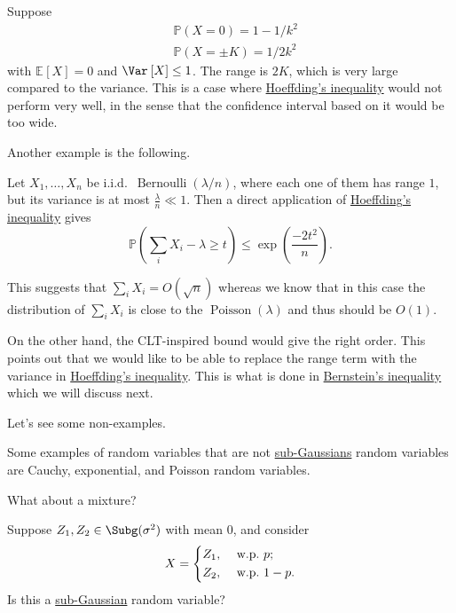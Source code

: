 \begin{eg}
	Suppose
	\[
		\begin{split}
			 & \mathbb{P} (X=0) = 1 - 1/k^2  \\
			 & \mathbb{P} (X=\pm K) = 1/2k^2
		\end{split}
	\]
	with \(\mathbb{E}_{}\left[X \right] =0\) and \(\Var_{}\left[X \right] \leq 1\). The range is \(2K\), which is very large compared to the variance. This is a case where \hyperref[thm:Hoeffding-inequality]{Hoeffding's inequality} would not perform very well, in the sense that the confidence interval based on it would be too wide.
\end{eg}

Another example is the following.

\begin{eg}
	Let \(X_1, \dots, X_n\) be i.i.d.\ \(\operatorname{Bernoulli}(\lambda / n)\), where each one of them has range \(1\), but its variance is at most \(\frac{\lambda}{n} \ll 1\). Then a direct application of \hyperref[thm:Hoeffding-inequality]{Hoeffding's inequality} gives
	\[
		\mathbb{P} \left( \sum_{i} X_i - \lambda \geq t \right) \leq \exp\left( \frac{-2t^2}{n} \right) .
	\]

	This suggests that \(\sum_{i} X_i = O(\sqrt{n})\) whereas we know that in this case the distribution of \(\sum_{i} X_i\) is close to the \(\operatorname{Poisson}(\lambda)\) and thus should be \(O(1)\).

	On the other hand, the CLT-inspired bound would give the right order. This points out that we would like to be able to replace the range term with the variance in \hyperref[thm:Hoeffding-inequality]{Hoeffding's inequality}. This is what is done in \hyperref[thm:Bernstein-inequality]{Bernstein's inequality} which we will discuss next.
\end{eg}

Let's see some non-examples.

\begin{eg}
	Some examples of random variables that are not \hyperref[def:sub-Gaussian]{sub-Gaussians} random variables are Cauchy, exponential, and Poisson random variables.
\end{eg}

What about a mixture?

\begin{problem*}
	Suppose \(Z_1, Z_2 \in \Subg(\sigma ^{2} ) \) with mean \(0\), and consider
	\[
		X = \begin{dcases}
			Z_1, & \text{ w.p.\ } p ;   \\
			Z_2, & \text{ w.p.\ } 1-p .
		\end{dcases}
	\]
	Is this a \hyperref[def:sub-Gaussian]{sub-Gaussian} random variable?
\end{problem*}


